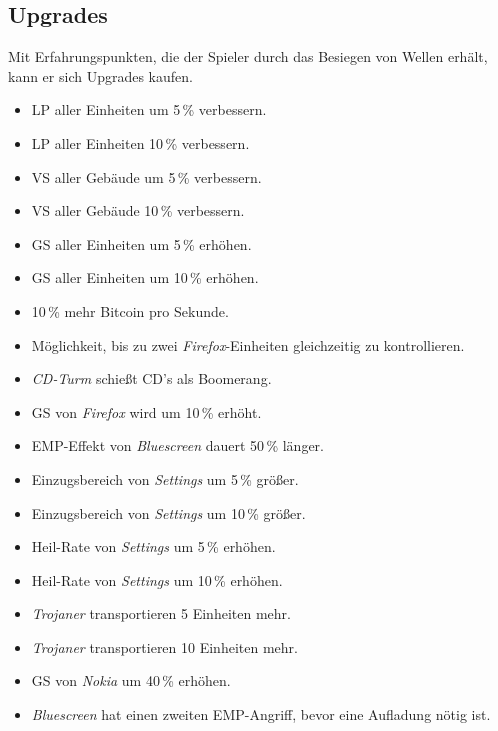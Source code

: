 \subsection{Upgrades}

%

Mit Erfahrungspunkten, die der Spieler durch das Besiegen von Wellen erhält,
kann er sich Upgrades kaufen.

\begin{itemize}[leftmargin=*, noitemsep]
	\item LP aller Einheiten um 5\,\% verbessern.
	\item LP aller Einheiten 10\,\% verbessern.
	\item VS aller Gebäude um 5\,\% verbessern.
	\item VS aller Gebäude 10\,\% verbessern.
	\item GS aller Einheiten um 5\,\% erhöhen.
	\item GS aller Einheiten um 10\,\% erhöhen.
	\item 10\,\% mehr Bitcoin pro Sekunde.
	\item Möglichkeit, bis zu zwei \emph{Firefox}-Einheiten gleichzeitig zu
    kontrollieren.
	\item \emph{CD-Turm} schießt CD's als Boomerang.
	\item GS von \emph{Firefox} wird um 10\,\% erhöht.
	\item EMP-Effekt von \emph{Bluescreen} dauert 50\,\% länger.
	\item Einzugsbereich von \emph{Settings} um 5\,\% größer.
	\item Einzugsbereich von \emph{Settings} um 10\,\% größer.
	\item Heil-Rate von \emph{Settings} um 5\,\% erhöhen.
	\item Heil-Rate von \emph{Settings} um 10\,\% erhöhen.
	\item \emph{Trojaner} transportieren 5 Einheiten mehr.
	\item \emph{Trojaner} transportieren 10 Einheiten mehr.
	\item GS von \emph{Nokia} um 40\,\% erhöhen.
  \item \emph{Bluescreen} hat einen zweiten EMP-Angriff, bevor eine Aufladung
    nötig ist.
\end{itemize}
